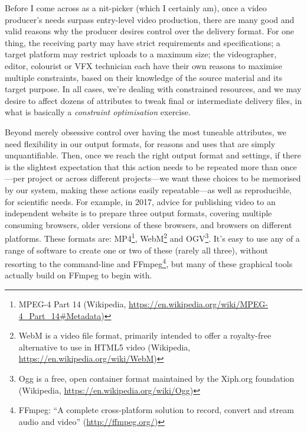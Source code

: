 \documentclass{article}
\begin{document}
Before I come across as a nit-picker (which I certainly am), once a video
producer's needs surpass entry-level video production, there are many good and
valid reasons why the producer desires control over the delivery format. For one
thing, the receiving party may have strict requirements and specifications; a
target platform may restrict uploads to a maximum size; the videographer,
editor, colourist or VFX technician each have their own reasons to maximise
multiple constraints, based on their knowledge of the source material and its
target purpose. In all cases, we're dealing with constrained resources, and we
may desire to affect dozens of attributes to tweak final or intermediate
delivery files, in what is basically a \emph{constraint optimisation} exercise.

Beyond merely obsessive control over having the most tuneable attributes, we
need flexibility in our output formats, for reasons and uses that are simply
unquantifiable. Then, once we reach the right output format and settings, if
there is the slightest expectation that this action needs to be repeated more
than once---per project or across different projects---we want these choices to
be memorised by our system, making these actions easily repeatable---as well as
reproducible, for scientific needs. For example, in 2017, advice for publishing
video to an independent website is to prepare three output formats, covering
multiple consuming browsers, older versions of these browsers, and browsers on
different platforms. These formats are: MP4\footnote{MPEG-4 Part 14 (Wikipedia, \href{https://en.wikipedia.org/wiki/MPEG-4\_Part\_14\#Metadata}{\url{https://en.wikipedia.org/wiki/MPEG-4\_Part\_14\#Metadata}})}, WebM\footnote{WebM is a video file format, primarily intended to offer a royalty-free
alternative to use in HTML5 video (Wikipedia, \href{https://en.wikipedia.org/wiki/WebM}{\url{https://en.wikipedia.org/wiki/WebM}})} and OGV\footnote{Ogg is a free, open container format maintained by the Xiph.org
foundation (Wikipedia, \href{https://en.wikipedia.org/wiki/Ogg}{\url{https://en.wikipedia.org/wiki/Ogg}})}.
It's easy to use any of a range of software to create one or two of these
(rarely all three), without resorting to the command-line and FFmpeg\footnote{FFmpeg: ``A complete cross-platform solution to record, convert and
stream audio and video'' (\href{http://ffmpeg.org/}{\url{http://ffmpeg.org/}})}, but
many of these graphical tools actually build on FFmpeg to begin with. 
\end{document}
